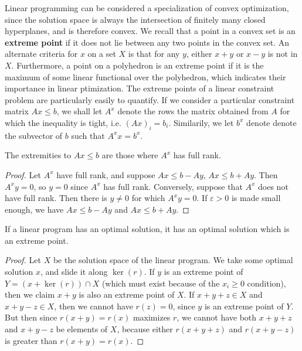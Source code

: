     Linear programming can be considered a specialization of convex optimization, since the solution space is always the intersection of finitely many closed hyperplanes, and is therefore convex. We recall that a point in a convex set is an {\bf extreme point} if it does not lie between any two points in the convex set. An alternate criteria for $x$ on a set $X$ is that for any $y$, either $x + y$ or $x - y$ is not in $X$. Furthermore, a point on a polyhedron is an extreme point if it is the maximum of some linear functional over the polyhedron, which indicates their importance in linear ptimization. The extreme points of a linear constraint problem are particularly easily to quantify. If we consider a particular constraint matrix $Ax \leq b$, we shall let $A^x$ denote the rows the matrix obtained from $A$ for which the inequality is tight, i.e. $(Ax)_i = b_i$. Similarily, we let $b^x$ denote denote the subvector of $b$ such that $A^x x = b^x$.

    \begin{theorem}
        The extremities to $Ax \leq b$ are those where $A^x$ has full rank.
    \end{theorem}
    \begin{proof}
        Let $A^x$ have full rank, and suppose $Ax \leq b - Ay$, $Ax \leq b + Ay$. Then $A^x y = 0$, so $y = 0$ since $A^x$ has full rank. Conversely, suppose that $A^x$ does not have full rank. Then there is $y \neq 0$ for which $A^x y = 0$. If $\varepsilon > 0$ is made small enough, we have $Ax \leq b - Ay$ and $Ax \leq b + Ay$.
    \end{proof}

    \begin{lemma}
        If a linear program has an optimal solution, it has an optimal solution which is an extreme point.
    \end{lemma}
    \begin{proof}
        Let $X$ be the solution space of the linear program. We take some optimal solution $x$, and slide it along $\ker(r)$. If $y$ is an extreme point of $Y = (x + \ker(r)) \cap X$ (which must exist because of the $x_i \geq 0$ condition), then we claim $x + y$ is also an extreme point of $X$. If $x + y + z \in X$ and $x + y - z \in X$, then we cannot have $r(z) = 0$, since $y$ is an extreme point of $Y$. But then since $r(x + y) = r(x)$ maximizes $r$, we cannot have both $x + y + z$ and $x + y - z$ be elements of $X$, because either $r(x + y + z)$ and $r(x + y - z)$ is greater than $r(x + y) = r(x)$.
    \end{proof}

